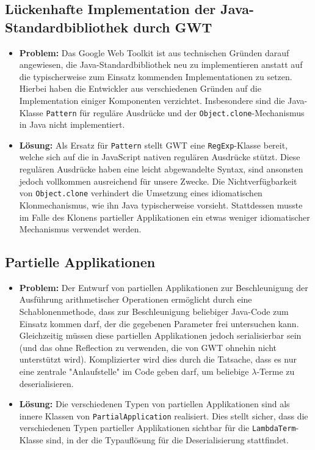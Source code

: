 \documentclass[parskip=full,11pt]{scrartcl}
\begin{document}
\subsection{Lückenhafte Implementation der Java-Standardbibliothek durch GWT}
\begin{itemize}
\item[] \textbf{Problem:} Das Google Web Toolkit ist aus technischen Gründen darauf angewiesen, die Java-Standardbibliothek neu zu implementieren
anstatt auf die typischerweise zum Einsatz kommenden Implementationen zu setzen. Hierbei haben die Entwickler aus
verschiedenen Gründen auf die Implementation einiger Komponenten verzichtet. Insbesondere sind die Java-Klasse \texttt{Pattern}
für reguläre Ausdrücke und der \texttt{Object.clone}-Mechanismus in Java nicht implementiert.
\item[] \textbf{Lösung:} Als Ersatz für \texttt{Pattern} stellt GWT eine \texttt{RegExp}-Klasse bereit, welche sich auf die in JavaScript
nativen regulären Ausdrücke stützt. Diese regulären Ausdrücke haben eine leicht abgewandelte Syntax, sind ansonsten jedoch vollkommen
ausreichend für unsere Zwecke. Die Nichtverfügbarkeit von \texttt{Object.clone} verhindert die Umsetzung eines idiomatischen Klonmechanismus,
wie ihn Java typischerweise vorsieht. Stattdessen musste im Falle des Klonens partieller Applikationen ein etwas weniger idiomatischer
Mechanismus verwendet werden.
\end{itemize}


\subsection{Partielle Applikationen}
\begin{itemize}
\item[] \textbf{Problem:} Der Entwurf von partiellen Applikationen zur Beschleunigung der Ausführung arithmetischer
Operationen ermöglicht durch eine Schablonenmethode, dass zur Beschleunigung beliebiger Java-Code zum Einsatz kommen
darf, der die gegebenen Parameter frei untersuchen kann. Gleichzeitig müssen diese partiellen Applikationen jedoch
serialisierbar sein (und das ohne Reflection zu verwenden, die von GWT ohnehin nicht unterstützt wird). Komplizierter
wird dies durch die Tatsache, dass es nur eine zentrale "Anlaufstelle" im Code geben darf, um beliebige $\lambda$-Terme
zu deserialisieren.
\item[] \textbf{Lösung:} Die verschiedenen Typen von partiellen Applikationen sind als innere Klassen von
\texttt{PartialApplication} realisiert. Dies stellt sicher, dass die verschiedenen Typen partieller Applikationen
sichtbar für die \texttt{LambdaTerm}-Klasse sind, in der die Typauflösung für die Deserialisierung stattfindet.
\end{itemize}
\end{document}
